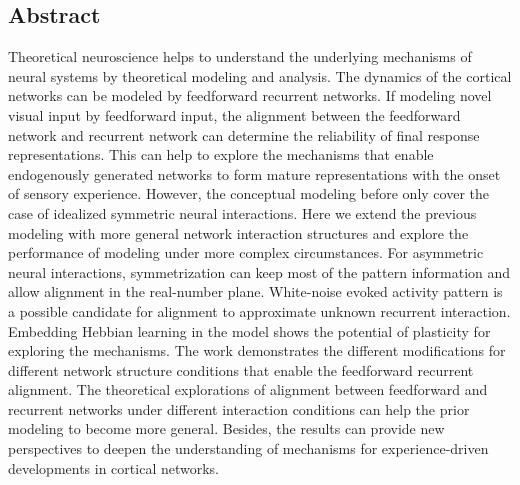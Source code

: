\documentclass[11pt]{article}
\begin{document}
	\begin{titlepage}
	
	\section*{Abstract}
	
	Theoretical neuroscience helps to understand the underlying mechanisms of neural systems by theoretical modeling and analysis. The dynamics of the cortical networks can be modeled by feedforward recurrent networks. If modeling novel visual input by feedforward input, the alignment between the feedforward network and recurrent network can determine the reliability of final response representations. This can help to explore the mechanisms that enable endogenously generated networks to form mature representations with the onset of sensory experience. However, the conceptual modeling before only cover the case of idealized symmetric neural interactions. Here we extend the previous modeling with more general network interaction structures and explore the performance of modeling under more complex circumstances.
	For asymmetric neural interactions, symmetrization can keep most of the pattern information and allow alignment in the real-number plane. White-noise evoked activity pattern is a possible candidate for alignment to approximate unknown recurrent interaction. Embedding Hebbian learning in the model shows the potential of plasticity for exploring the mechanisms. The work demonstrates the different modifications for different network structure conditions that enable the feedforward recurrent alignment. 
	The theoretical explorations of alignment between feedforward and recurrent networks under different interaction conditions can help the prior modeling to become more general. Besides, the results can provide new perspectives to deepen the understanding of mechanisms for experience-driven developments in cortical networks. 
	
	\end{titlepage}
\end{document}
